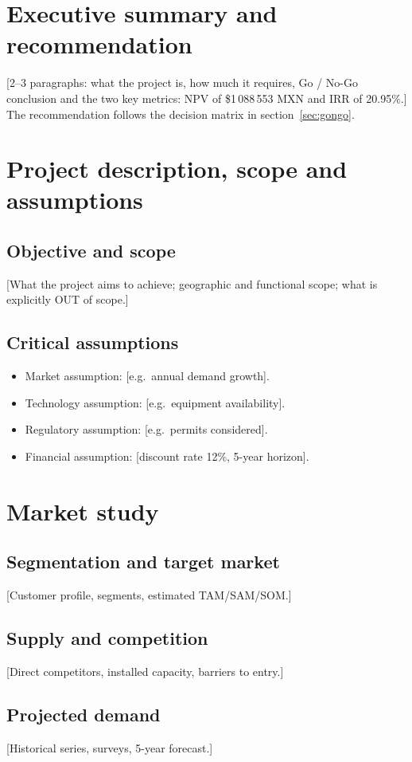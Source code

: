 \documentclass[12pt]{article}
\newcommand{\TasaDescuento}{12}
\newcommand{\VANbase}{1\,088\,553}
\newcommand{\TIRbase}{20.95}
\newcommand{\Moneda}{MXN}
\begin{document}

\tableofcontents
\newpage

\section{Executive summary and recommendation}
[2–3 paragraphs: what the project is, how much it requires, Go / No-Go
conclusion and the two key metrics: NPV of \$\VANbase{} \Moneda{} and IRR
of \TIRbase{}\%.] The recommendation follows the decision matrix in
section~\ref{sec:gongo}.

\section{Project description, scope and assumptions}
\subsection{Objective and scope}
[What the project aims to achieve; geographic and functional scope; what is
explicitly OUT of scope.]
\subsection{Critical assumptions}
\begin{itemize}
  \item Market assumption: [e.g.\ annual demand growth].
  \item Technology assumption: [e.g.\ equipment availability].
  \item Regulatory assumption: [e.g.\ permits considered].
  \item Financial assumption: [discount rate \TasaDescuento{}\%, 5-year horizon].
\end{itemize}

\section{Market study}
\subsection{Segmentation and target market}
[Customer profile, segments, estimated TAM/SAM/SOM.]
\subsection{Supply and competition}
[Direct competitors, installed capacity, barriers to entry.]
\subsection{Projected demand}
[Historical series, surveys, 5-year forecast.]
\end{document}
